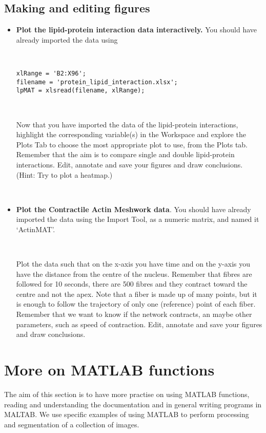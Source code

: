 \documentclass[11pt]{amsart}
\begin{document}
\subsection{Making and editing figures}
\begin{itemize}
\item {\bf Plot the lipid-protein interaction data  interactively.} 
You should have already imported the data using 

\

\color{blue}
\begin{verbatim}
xlRange = 'B2:X96';
filename = 'protein_lipid_interaction.xlsx';
lpMAT = xlsread(filename, xlRange);
\end{verbatim}
\color{black}

\

Now that you have imported the data of the lipid-protein interactions, highlight the corresponding variable(s) in the Workspace and explore the Plots Tab to choose the most appropriate plot to use, from the Plots tab. Remember that the aim is to compare single and double lipid-protein interactions. Edit, annotate and save your figures and draw conclusions. (Hint: Try to plot a heatmap.)

\

\item {\bf Plot the Contractile Actin Meshwork data}. You should have already imported the data using the Import Tool, as a numeric matrix, and named it `ActinMAT'.

\

Plot the data such that on the x-axis you have time and on the y-axis you have the distance from the centre of the nucleus. Remember that fibres are followed for 10 seconds, there are 500 fibres and they contract toward the centre and not the apex. Note that a fiber is made up of many points, but it is  enough to follow the trajectory of only one (reference) point of each fiber. Remember that we want to know if the network contracts, an maybe other parameters, such as speed of contraction. Edit, annotate and save your figures and draw conclusions.
\end{itemize}

\section{More on MATLAB functions}

The aim of this section is to have more practise on using MATLAB functions, reading and understanding the documentation and in general writing programs in MALTAB. We use specific examples of using MATLAB to perform processing and segmentation of a collection of images. 
\end{document}
